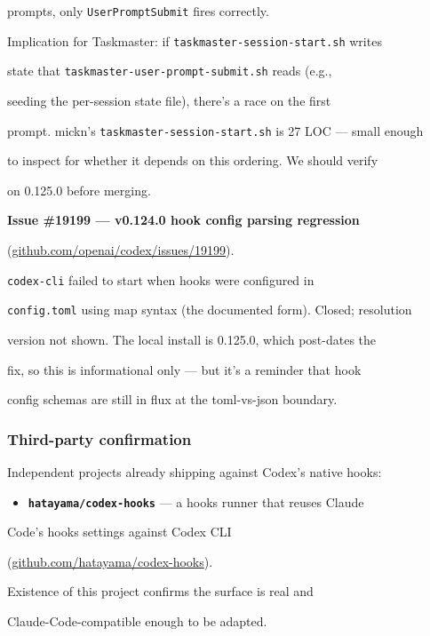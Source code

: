 \documentclass[twocolumn,10pt,letterpaper]{article}
\begin{document}
prompts, only \texttt{UserPromptSubmit} fires correctly.


Implication for Taskmaster: if \texttt{taskmaster-\allowbreak session-\allowbreak start.sh} writes

state that \texttt{taskmaster-\allowbreak user-\allowbreak prompt-\allowbreak submit.sh} reads (e.g.,

seeding the per-session state file), there's a race on the first

prompt. mickn's \texttt{taskmaster-\allowbreak session-\allowbreak start.sh} is 27 LOC — small enough

to inspect for whether it depends on this ordering. We should verify

on 0.125.0 before merging.


\textbf{Issue \#19199 — v0.124.0 hook config parsing regression}

(\href{https://github.com/openai/codex/issues/19199}{github.com/openai/codex/issues/19199}).

\texttt{codex-\allowbreak cli} failed to start when hooks were configured in

\texttt{config.toml} using map syntax (the documented form). Closed; resolution

version not shown. The local install is 0.125.0, which post-dates the

fix, so this is informational only — but it's a reminder that hook

config schemas are still in flux at the toml-vs-json boundary.


\subsubsection{Third-party confirmation}

Independent projects already shipping against Codex's native hooks:


\begin{itemize}
\setlength{\itemsep}{0pt}
\setlength{\parskip}{0pt}
  \item \textbf{\texttt{hatayama/\allowbreak codex-\allowbreak hooks}} — a hooks runner that reuses Claude
\end{itemize}
  Code's hooks settings against Codex CLI

  (\href{https://github.com/hatayama/codex-hooks}{github.com/hatayama/codex-hooks}).

  Existence of this project confirms the surface is real and

  Claude-Code-compatible enough to be adapted.
\end{document}
